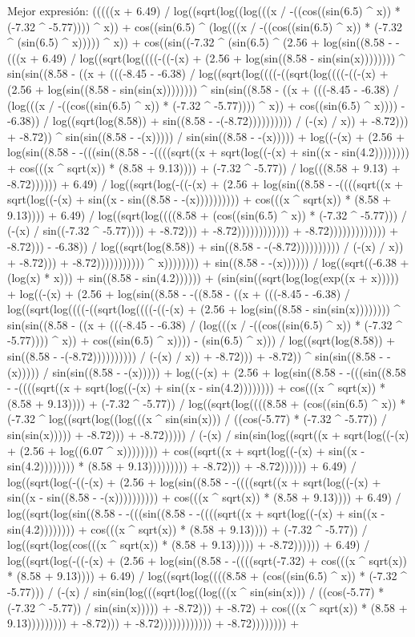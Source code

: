 Mejor expresión: (((((x + 6.49) / log((sqrt(log((log(((x / -((cos((sin(6.5) ^ x)) * (-7.32 ^ -5.77)))) ^ x)) + cos((sin(6.5) ^ (log(((x / -((cos((sin(6.5) ^ x)) * (-7.32 ^ (sin(6.5) ^ x))))) ^ x)) + cos((sin((-7.32 ^ (sin(6.5) ^ (2.56 + log(sin((8.58 - -(((x + 6.49) / log((sqrt(log((((-((-(x) + (2.56 + log(sin((8.58 - sin(sin(x)))))))) ^ sin(sin((8.58 - ((x + (((-8.45 - -6.38) / log((sqrt(log((((-((sqrt(log((((-((-(x) + (2.56 + log(sin((8.58 - sin(sin(x)))))))) ^ sin(sin((8.58 - ((x + (((-8.45 - -6.38) / (log(((x / -((cos((sin(6.5) ^ x)) * (-7.32 ^ -5.77)))) ^ x)) + cos((sin(6.5) ^ x)))) - -6.38)) / log((sqrt(log(8.58)) + sin((8.58 - -(-8.72)))))))))) / (-(x) / x)) + -8.72))) + -8.72)) ^ sin(sin((8.58 - -(x))))) / sin(sin((8.58 - -(x))))) + log((-(x) + (2.56 + log(sin((8.58 - -(((sin((8.58 - -((((sqrt((x + sqrt(log((-(x) + sin((x - sin(4.2)))))))) + cos(((x ^ sqrt(x)) * (8.58 + 9.13)))) + (-7.32 ^ -5.77)) / log(((8.58 + 9.13) + -8.72)))))) + 6.49) / log((sqrt(log(-((-(x) + (2.56 + log(sin((8.58 - -((((sqrt((x + sqrt(log((-(x) + sin((x - sin((8.58 - -(x)))))))))) + cos(((x ^ sqrt(x)) * (8.58 + 9.13)))) + 6.49) / log((sqrt(log((((8.58 + (cos((sin(6.5) ^ x)) * (-7.32 ^ -5.77))) / (-(x) / sin((-7.32 ^ -5.77)))) + -8.72))) + -8.72)))))))))))) + -8.72))))))))))))) + -8.72))) - -6.38)) / log((sqrt(log(8.58)) + sin((8.58 - -(-8.72)))))))))) / (-(x) / x)) + -8.72))) + -8.72))))))))))) ^ x)))))))) + sin((8.58 - -(x)))))) / log((sqrt((-6.38 + (log(x) * x))) + sin((8.58 - sin(4.2)))))) + (sin(sin((sqrt(log(log(exp((x + x))))) + log((-(x) + (2.56 + log(sin((8.58 - -((8.58 - ((x + (((-8.45 - -6.38) / log((sqrt(log((((-((sqrt(log((((-((-(x) + (2.56 + log(sin((8.58 - sin(sin(x)))))))) ^ sin(sin((8.58 - ((x + (((-8.45 - -6.38) / (log(((x / -((cos((sin(6.5) ^ x)) * (-7.32 ^ -5.77)))) ^ x)) + cos((sin(6.5) ^ x)))) - (sin(6.5) ^ x))) / log((sqrt(log(8.58)) + sin((8.58 - -(-8.72)))))))))) / (-(x) / x)) + -8.72))) + -8.72)) ^ sin(sin((8.58 - -(x))))) / sin(sin((8.58 - -(x))))) + log((-(x) + (2.56 + log(sin((8.58 - -(((sin((8.58 - -((((sqrt((x + sqrt(log((-(x) + sin((x - sin(4.2)))))))) + cos(((x ^ sqrt(x)) * (8.58 + 9.13)))) + (-7.32 ^ -5.77)) / log((sqrt(log((((8.58 + (cos((sin(6.5) ^ x)) * (-7.32 ^ log((sqrt(log((log(((x ^ sin(sin(x))) / ((cos(-5.77) * (-7.32 ^ -5.77)) / sin(sin(x))))) + -8.72))) + -8.72))))) / (-(x) / sin(sin(log((sqrt((x + sqrt(log((-(x) + (2.56 + log((6.07 ^ x)))))))) + cos((sqrt((x + sqrt(log((-(x) + sin((x - sin(4.2)))))))) * (8.58 + 9.13))))))))) + -8.72))) + -8.72)))))) + 6.49) / log((sqrt(log(-((-(x) + (2.56 + log(sin((8.58 - -((((sqrt((x + sqrt(log((-(x) + sin((x - sin((8.58 - -(x)))))))))) + cos(((x ^ sqrt(x)) * (8.58 + 9.13)))) + 6.49) / log((sqrt(log(sin((8.58 - -(((sin((8.58 - -((((sqrt((x + sqrt(log((-(x) + sin((x - sin(4.2)))))))) + cos(((x ^ sqrt(x)) * (8.58 + 9.13)))) + (-7.32 ^ -5.77)) / log((sqrt(log(cos(((x ^ sqrt(x)) * (8.58 + 9.13))))) + -8.72)))))) + 6.49) / log((sqrt(log(-((-(x) + (2.56 + log(sin((8.58 - -((((sqrt(-7.32) + cos(((x ^ sqrt(x)) * (8.58 + 9.13)))) + 6.49) / log((sqrt(log((((8.58 + (cos((sin(6.5) ^ x)) * (-7.32 ^ -5.77))) / (-(x) / sin(sin(log(((sqrt(log((log(((x ^ sin(sin(x))) / ((cos(-5.77) * (-7.32 ^ -5.77)) / sin(sin(x))))) + -8.72))) + -8.72) + cos(((x ^ sqrt(x)) * (8.58 + 9.13))))))))) + -8.72))) + -8.72)))))))))))) + -8.72)))))))) + 